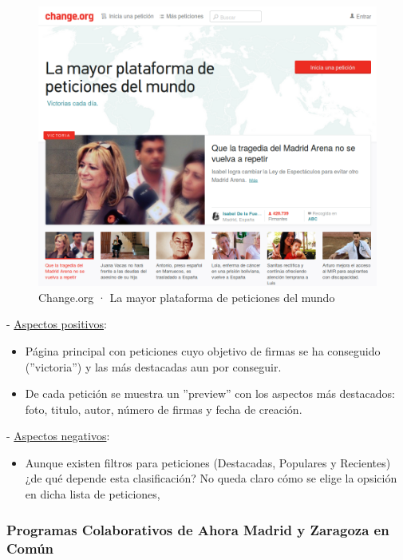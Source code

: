 \begin{figure}[H]
\centering
\includegraphics[keepaspectratio, scale=0.30]{Media/Captures/changeOrg.png}
\caption{Change.org · La mayor plataforma de peticiones del mundo}
\label{fig:changeOrg}
\end{figure}

 - \underline{Aspectos positivos}:

\begin{itemize}
	\item Página principal con peticiones cuyo objetivo de firmas se ha conseguido (''victoria'') y las más destacadas aun por conseguir.
	\item De cada petición se muestra un ''preview'' con los aspectos más destacados: foto, titulo, autor, número de firmas y fecha de creación.
\end{itemize}

 - \underline{Aspectos negativos}:

\begin{itemize}
	\item Aunque existen filtros para peticiones (Destacadas, Populares y Recientes) ¿de qué depende esta clasificación? No queda claro cómo se elige la opsición en dicha lista de peticiones,
\end{itemize}

\subsubsection{Programas Colaborativos de Ahora Madrid y Zaragoza en Común}

